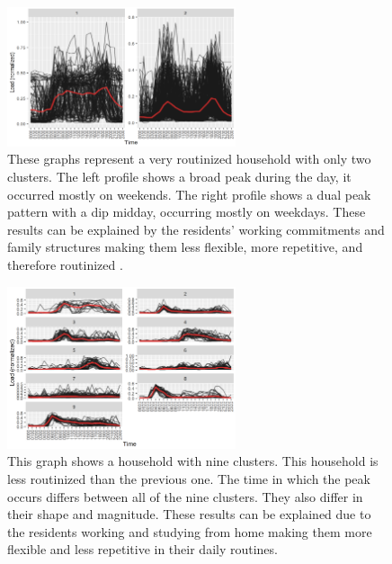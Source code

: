 \begin{figure}
    \centering
    \includegraphics[width=0.6\textwidth]{figures/malatesta_hsop/malatesta_routinisedHousehold.jpg}
    \caption{These graphs represent a very routinized household with only two clusters.
    The left profile shows a broad peak during the day, it occurred mostly on weekends.
    The right profile shows a dual peak pattern with a dip midday, occurring mostly on weekdays.
    These results can be explained by the residents' working commitments and family structures making them less flexible, more repetitive, and therefore routinized \cite{BRE-EWP}.
    }
    \label{fig:routinized_household}
\end{figure}

\begin{figure}
    \centering
    \includegraphics[width=0.6\textwidth]{figures/malatesta_hsop/malatesta_unroutinisedHousehold.jpg}
    \caption{This graph shows a household with nine clusters.
    This household is less routinized than the previous one.
    The time in which the peak occurs differs between all of the nine clusters.
    They also differ in their shape and magnitude.
    These results can be explained due to the residents working and studying from home making them more flexible and less repetitive in their daily routines.
    }
    \label{fig:non_routinized_household}
\end{figure}
